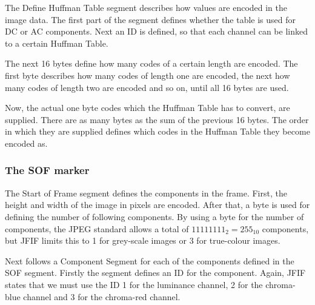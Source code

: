 \begin{infobox}
The Define Huffman Table segment describes how values are encoded in the image data. 
The first part of the segment defines whether the table is used for DC or AC components.
Next an ID is defined, so that each channel can be linked to a certain Huffman Table.

The next 16 bytes define how many codes of a certain length are encoded. 
The first byte describes how many codes of length one are encoded, the next how many codes of length two are encoded and so on, until all 16 bytes are used. 

Now, the actual one byte codes which the Huffman Table has to convert, are supplied.
There are as many bytes as the sum of the previous 16 bytes. 
The order in which they are supplied defines which codes in the Huffman Table they become encoded as.

\subsubsection{The SOF marker}
\begin{centering}
\end{centering}

The Start of Frame segment defines the components in the frame. 
First, the height and width of the image in pixels are encoded. 
After that, a byte is used for defining the number of following components.
By using a byte for the number of components, the JPEG standard allows a total of $11111111_2=255_{10}$ components, but JFIF limits this to 1 for grey-scale images or 3 for true-colour images.

Next follows a Component Segment for each of the components defined in the SOF segment.
Firstly the segment defines an ID for the component.
Again, JFIF states that we must use the ID 1 for the luminance channel, 2 for the chroma-blue channel and 3 for the chroma-red channel.


\end{infobox}
